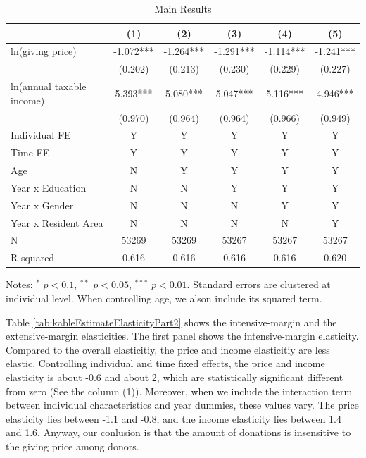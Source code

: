 \documentclass[ review  , 3p ]{elsarticle}
\begin{document}
  \begin{table}

  \caption{\label{tab:kableEstimateElasticityPart1}Main Results}
  \centering
  \fontsize{7}{9}\selectfont
  \begin{threeparttable}
  \begin{tabular}[t]{lccccc}
  \toprule
   & (1) & (2) & (3) & (4) & (5)\\
  \midrule
  ln(giving price) & -1.072*** & -1.264*** & -1.291*** & -1.114*** & -1.241***\\
   & (0.202) & (0.213) & (0.230) & (0.229) & (0.227)\\
  ln(annual taxable income) & 5.393*** & 5.080*** & 5.047*** & 5.116*** & 4.946***\\
   & (0.970) & (0.964) & (0.964) & (0.966) & (0.949)\\
  Individual FE & Y & Y & Y & Y & Y\\
  Time FE & Y & Y & Y & Y & Y\\
  Age & N & Y & Y & Y & Y\\
  Year x Education & N & N & Y & Y & Y\\
  Year x Gender & N & N & N & Y & Y\\
  Year x Resident Area & N & N & N & N & Y\\
  N & 53269 & 53269 & 53267 & 53267 & 53267\\
  R-squared & 0.616 & 0.616 & 0.616 & 0.616 & 0.620\\
  \bottomrule
  \end{tabular}
  \begin{tablenotes}
  \item Notes: $^{*}$ $p < 0.1$, $^{**}$ $p < 0.05$, $^{***}$ $p < 0.01$. Standard errors are clustered at individual level. When controlling age, we alson include its squared term.
  \end{tablenotes}
  \end{threeparttable}
  \end{table}

  Table \ref{tab:kableEstimateElasticityPart2} shows the intensive-margin and the extensive-margin elasticities.
  The first panel shows the intensive-margin elasticity.
  Compared to the overall elasticitiy, the price and income elasticitiy are less elastic.
  Controlling individual and time fixed effects,
  the price and income elasticity is about -0.6 and about 2,
  which are statistically significant different from zero (See the column (1)).
  Moreover, when we include the interaction term between individual characteristics and year dummies,
  these values vary.
  The price elasticity lies between -1.1 and -0.8,
  and the income elasticity lies between 1.4 and 1.6.
  Anyway, our conlusion is that the amount of donations is insensitive to the giving price among donors.
\end{document}
